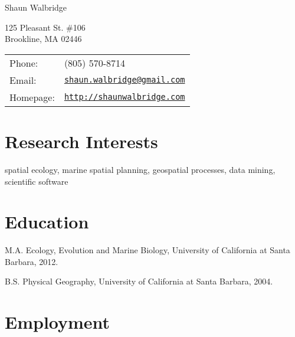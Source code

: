\documentclass[letterpaper]{article}
\def\name{Shaun Walbridge}
\renewenvironment{itemize}{
  \begin{list}{}{
    \setlength{\leftmargin}{1.5em}
  }
}{
  \end{list}
}
\begin{document}
{\huge \name}


\vspace{0.25in}

\begin{minipage}{0.45\linewidth}
   125 Pleasant St. \#106 \\
   Brookline, MA 02446
\end{minipage}
\begin{minipage}[t]{0.45\linewidth}
  \begin{tabular}{ll}
    Phone: & (805) 570-8714\\
    Email: & \href{mailto:shaun.walbridge@gmail.com}{\tt shaun.walbridge@gmail.com} \\
    Homepage: & \href{http://shaunwalbridge.com}{\tt http://shaunwalbridge.com} \\
  \end{tabular}
\end{minipage}

\section*{Research Interests}

spatial ecology, marine spatial planning, geospatial processes, data mining, scientific software

\section*{Education}

\begin{itemize}
  \item M.A. Ecology, Evolution and Marine Biology, University of California at Santa Barbara, 2012.
  \item B.S. Physical Geography, University of California at Santa Barbara, 2004.
\end{itemize}

\section*{Employment}
\end{document}
